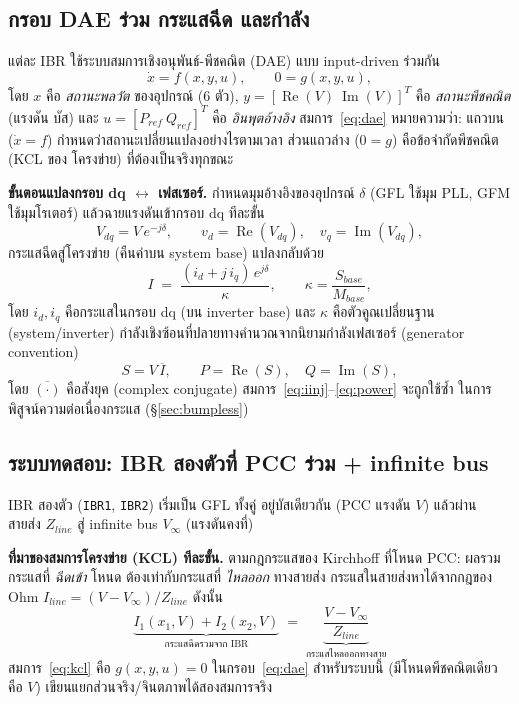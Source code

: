 \documentclass[12pt,a4paper]{article}
\newcommand{\re}{\operatorname{Re}}
\newcommand{\im}{\operatorname{Im}}
\begin{document}
\subsection{กรอบ DAE ร่วม กระแสฉีด และกำลัง}
\label{sec:dae}
แต่ละ IBR ใช้ระบบสมการเชิงอนุพันธ์-พีชคณิต (DAE) แบบ input-driven ร่วมกัน
\begin{equation}
\dot{x} = f(x,y,u), \qquad 0 = g(x,y,u),
\label{eq:dae}
\end{equation}
โดย $x$ คือ \emph{สถานะพลวัต} ของอุปกรณ์ (6 ตัว), $y=[\re(V)\ \im(V)]^T$ คือ \emph{สถานะพีชคณิต} (แรงดัน
บัส) และ $u=[P_{ref}\ Q_{ref}]^T$ คือ \emph{อินพุตอ้างอิง} สมการ~\eqref{eq:dae} หมายความว่า: แถวบน
($\dot x=f$) กำหนดว่าสถานะเปลี่ยนแปลงอย่างไรตามเวลา ส่วนแถวล่าง ($0=g$) คือข้อจำกัดพีชคณิต (KCL ของ
โครงข่าย) ที่ต้องเป็นจริงทุกขณะ

\textbf{ขั้นตอนแปลงกรอบ dq $\leftrightarrow$ เฟสเซอร์.} กำหนดมุมอ้างอิงของอุปกรณ์ $\delta$ (GFL ใช้มุม
PLL, GFM ใช้มุมโรเตอร์) แล้วฉายแรงดันเข้ากรอบ dq ทีละขั้น
\begin{equation}
V_{dq} = V\,e^{-j\delta},\qquad v_d = \re(V_{dq}),\quad v_q = \im(V_{dq}),
\label{eq:vdq}
\end{equation}
กระแสฉีดสู่โครงข่าย (คืนค่าบน system base) แปลงกลับด้วย
\begin{equation}
I \;=\; \frac{(i_d + j\,i_q)\,e^{j\delta}}{\kappa},\qquad \kappa=\frac{S_{base}}{M_{base}},
\label{eq:iinj}
\end{equation}
โดย $i_d,i_q$ คือกระแสในกรอบ dq (บน inverter base) และ $\kappa$ คือตัวคูณเปลี่ยนฐาน (system/inverter)
กำลังเชิงซ้อนที่ปลายทางคำนวณจากนิยามกำลังเฟสเซอร์ (generator convention)
\begin{equation}
S = V\,\overline{I},\qquad P=\re(S),\quad Q=\im(S),
\label{eq:power}
\end{equation}
โดย $\overline{(\cdot)}$ คือสังยุค (complex conjugate) สมการ~\eqref{eq:iinj}--\eqref{eq:power} จะถูกใช้ซ้ำ
ในการพิสูจน์ความต่อเนื่องกระแส (\S\ref{sec:bumpless})

\subsection{ระบบทดสอบ: IBR สองตัวที่ PCC ร่วม + infinite bus}
\label{sec:kcl}
IBR สองตัว (\texttt{IBR1}, \texttt{IBR2}) เริ่มเป็น GFL ทั้งคู่ อยู่บัสเดียวกัน (PCC แรงดัน $V$) แล้วผ่าน
สายส่ง $Z_{line}$ สู่ infinite bus $V_\infty$ (แรงดันคงที่)

\textbf{ที่มาของสมการโครงข่าย (KCL) ทีละขั้น.} ตามกฎกระแสของ Kirchhoff ที่โหนด PCC: ผลรวมกระแสที่
\emph{ฉีดเข้า} โหนด ต้องเท่ากับกระแสที่ \emph{ไหลออก} ทางสายส่ง กระแสในสายส่งหาได้จากกฎของ Ohm
$I_{line} = (V - V_\infty)/Z_{line}$ ดังนั้น
\begin{equation}
\underbrace{I_1(x_1,V) + I_2(x_2,V)}_{\text{กระแสฉีดรวมจาก IBR}}
\;=\;
\underbrace{\frac{V - V_\infty}{Z_{line}}}_{\text{กระแสไหลออกทางสาย}}
\label{eq:kcl}
\end{equation}
สมการ~\eqref{eq:kcl} คือ $g(x,y,u)=0$ ในกรอบ~\eqref{eq:dae} สำหรับระบบนี้ (มีโหนดพีชคณิตเดียวคือ $V$)
เขียนแยกส่วนจริง/จินตภาพได้สองสมการจริง
\end{document}
